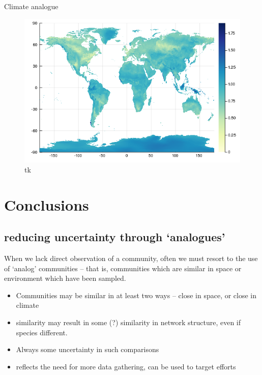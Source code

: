 Climate analogue

\begin{figure}
\centering
\includegraphics{figures/figure_03_b.png}
\caption{tk\label{fig:analog}}
\end{figure}

\hypertarget{conclusions}{%
\section{Conclusions}\label{conclusions}}

\hypertarget{reducing-uncertainty-through-analogues}{%
\subsection{reducing uncertainty through
`analogues'}\label{reducing-uncertainty-through-analogues}}

When we lack direct observation of a community, often we must resort to
the use of `analog' communities -- that is, communities which are
similar in space or environment which have been sampled.

\begin{itemize}
\tightlist
\item
  Communities may be similar in at least two ways -- close in space, or
  close in climate
\item
  similarity may result in some (?) similarity in network structure,
  even if species different.
\item
  Always some uncertainty in such comparisons
\item
  reflects the need for more data gathering, can be used to target
  efforts
\end{itemize}

